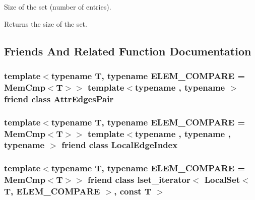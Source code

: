 Size of the set (number of entries). 

\begin{DoxyReturn}{Returns}
the size of the set. 
\end{DoxyReturn}


\subsection{Friends And Related Function Documentation}
\hypertarget{classshad_1_1LocalSet_af9dbb4ffd51a4c29389ab2f892cd5e82}{
\subsubsection[{Attr\-Edges\-Pair}]{\setlength{\rightskip}{0pt plus 5cm}template$<$typename T, typename E\-L\-E\-M\-\_\-\-C\-O\-M\-P\-A\-R\-E = Mem\-Cmp$<$\-T$>$$>$ template$<$typename , typename $>$ friend class {\bf Attr\-Edges\-Pair}\hspace{0.3cm}{\ttfamily [friend]}}}\label{classshad_1_1LocalSet_af9dbb4ffd51a4c29389ab2f892cd5e82}
\hypertarget{classshad_1_1LocalSet_afc8d107f39c9ea0b8848ea970eb36b93}{
\subsubsection[{Local\-Edge\-Index}]{\setlength{\rightskip}{0pt plus 5cm}template$<$typename T, typename E\-L\-E\-M\-\_\-\-C\-O\-M\-P\-A\-R\-E = Mem\-Cmp$<$\-T$>$$>$ template$<$typename , typename , typename $>$ friend class {\bf Local\-Edge\-Index}\hspace{0.3cm}{\ttfamily [friend]}}}\label{classshad_1_1LocalSet_afc8d107f39c9ea0b8848ea970eb36b93}
\hypertarget{classshad_1_1LocalSet_a7fa8272788381da5a3b8cadef548a77f}{
\subsubsection[{lset\-\_\-iterator$<$ Local\-Set$<$ T, E\-L\-E\-M\-\_\-\-C\-O\-M\-P\-A\-R\-E $>$, const T $>$}]{\setlength{\rightskip}{0pt plus 5cm}template$<$typename T, typename E\-L\-E\-M\-\_\-\-C\-O\-M\-P\-A\-R\-E = Mem\-Cmp$<$\-T$>$$>$ friend class {\bf lset\-\_\-iterator}$<$ {\bf Local\-Set}$<$ T, E\-L\-E\-M\-\_\-\-C\-O\-M\-P\-A\-R\-E $>$, const T $>$\hspace{0.3cm}{\ttfamily [friend]}}}\label{classshad_1_1LocalSet_a7fa8272788381da5a3b8cadef548a77f}
